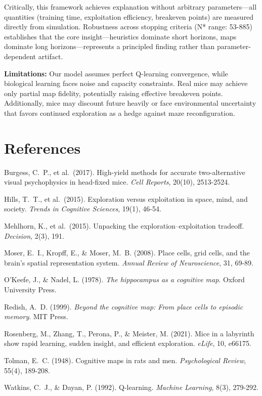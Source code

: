 Critically, this framework achieves explanation without arbitrary parameters—all quantities (training time, exploitation efficiency, breakeven points) are measured directly from simulation. Robustness across stopping criteria (N* range: 53-885) establishes that the core insight—heuristics dominate short horizons, maps dominate long horizons—represents a principled finding rather than parameter-dependent artifact.

\textbf{Limitations:} Our model assumes perfect Q-learning convergence, while biological learning faces noise and capacity constraints. Real mice may achieve only partial map fidelity, potentially raising effective breakeven points. Additionally, mice may discount future heavily or face environmental uncertainty that favors continued exploration as a hedge against maze reconfiguration.

\section*{References}
\small
Burgess, C.\ P., et al.\ (2017). High-yield methods for accurate two-alternative visual psychophysics in head-fixed mice. \textit{Cell Reports}, 20(10), 2513-2524.

Hills, T.\ T., et al.\ (2015). Exploration versus exploitation in space, mind, and society. \textit{Trends in Cognitive Sciences}, 19(1), 46-54.

Mehlhorn, K., et al.\ (2015). Unpacking the exploration–exploitation tradeoff. \textit{Decision}, 2(3), 191.

Moser, E.\ I., Kropff, E., \& Moser, M.\ B. (2008). Place cells, grid cells, and the brain's spatial representation system. \textit{Annual Review of Neuroscience}, 31, 69-89.

O'Keefe, J., \& Nadel, L. (1978). \textit{The hippocampus as a cognitive map}. Oxford University Press.

Redish, A.\ D. (1999). \textit{Beyond the cognitive map: From place cells to episodic memory}. MIT Press.

Rosenberg, M., Zhang, T., Perona, P., \& Meister, M. (2021). Mice in a labyrinth show rapid learning, sudden insight, and efficient exploration. \textit{eLife}, 10, e66175.

Tolman, E.\ C. (1948). Cognitive maps in rats and men. \textit{Psychological Review}, 55(4), 189-208.

Watkins, C.\ J., \& Dayan, P. (1992). Q-learning. \textit{Machine Learning}, 8(3), 279-292.


